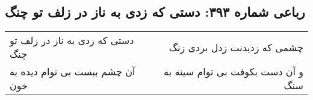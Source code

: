 \begin{center}
\section*{رباعی شماره ۳۹۳: دستی که زدی به ناز در زلف تو چنگ}
\label{sec:sh393}
\begin{longtable}{l p{0.5cm} r}
دستی که زدی به ناز در زلف تو چنگ
&&
چشمی که زدیدنت زدل بردی زنگ
\\
آن چشم ببست بی توام دیده به خون
&&
و آن دست بکوفت بی توام سینه به سنگ
\\
\end{longtable}
\end{center}
